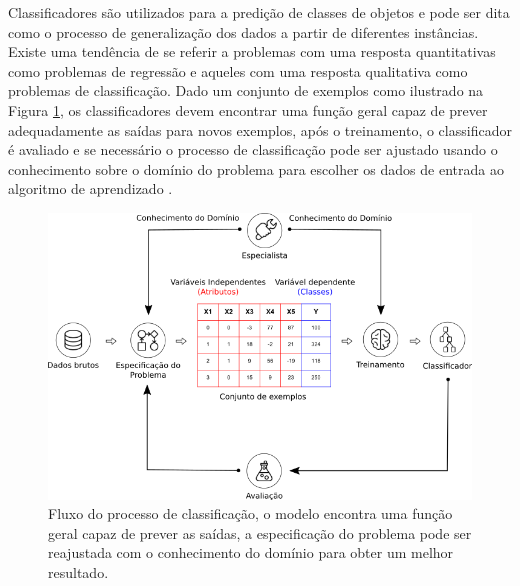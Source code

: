 Classificadores são utilizados para a predição de classes de objetos e pode ser 
dita como o processo de generalização dos dados a partir de diferentes 
instâncias. Existe uma tendência de se referir a problemas com uma resposta 
quantitativas como problemas de regressão e aqueles com uma resposta 
qualitativa como problemas de classificação. Dado um conjunto de exemplos como 
ilustrado na Figura \ref{figure:processo_classificacao}, os classificadores 
devem encontrar uma função geral capaz de prever adequadamente as saídas para 
novos exemplos, após o treinamento, o classificador é avaliado e se necessário 
o processo de classificação pode ser ajustado usando o conhecimento sobre o 
domínio do problema para escolher os dados de entrada ao algoritmo de 
aprendizado \cite{porthos_motta:2016}.

\begin{figure}[H]
\begin{center}
    \includegraphics[scale=0.60]{images/processo_classificacao.png}
\end{center}
\caption{Fluxo do processo de classificação, o modelo encontra uma função geral 
capaz de prever as saídas, a especificação do problema pode ser reajustada com 
o conhecimento do domínio para obter um melhor resultado.}
\label{figure:processo_classificacao}
\end{figure}

